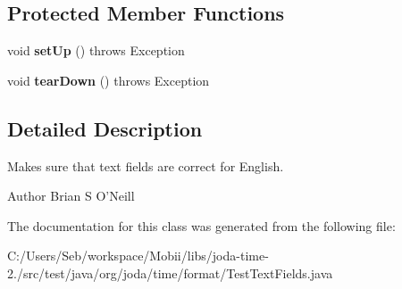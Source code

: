 \subsection*{Protected Member Functions}
\begin{DoxyCompactItemize}
\item 
\hypertarget{classorg_1_1joda_1_1time_1_1format_1_1_test_text_fields_a1cf0b7ce5cad42860223a0bfcf7d23d1}{void {\bfseries set\-Up} ()  throws Exception }\label{classorg_1_1joda_1_1time_1_1format_1_1_test_text_fields_a1cf0b7ce5cad42860223a0bfcf7d23d1}

\item 
\hypertarget{classorg_1_1joda_1_1time_1_1format_1_1_test_text_fields_a36fafd50b46f0c15e17f3f571494fb69}{void {\bfseries tear\-Down} ()  throws Exception }\label{classorg_1_1joda_1_1time_1_1format_1_1_test_text_fields_a36fafd50b46f0c15e17f3f571494fb69}

\end{DoxyCompactItemize}


\subsection{Detailed Description}
Makes sure that text fields are correct for English.

\begin{DoxyAuthor}{Author}
Brian S O'Neill 
\end{DoxyAuthor}


The documentation for this class was generated from the following file\-:\begin{DoxyCompactItemize}
\item 
C\-:/\-Users/\-Seb/workspace/\-Mobii/libs/joda-\/time-\/2./src/test/java/org/joda/time/format/Test\-Text\-Fields.\-java\end{DoxyCompactItemize}
